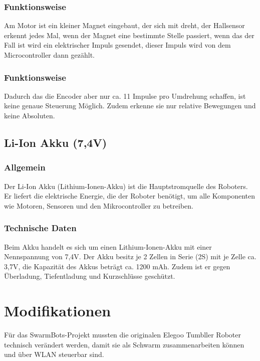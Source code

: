 \subsubsection{Funktionsweise}
Am Motor ist ein kleiner Magnet eingebaut, der sich mit dreht, der Hallsensor erkennt jedes Mal, wenn der Magnet eine bestimmte Stelle passiert, 
wenn das der Fall ist wird ein elektrischer Impuls gesendet, dieser Impuls wird von dem Microcontroller dann gezählt.
\subsubsection{Funktionsweise}
Dadurch das die Encoder aber nur ca. 11 Impulse pro Umdrehung schaffen, ist keine genaue Steuerung Möglich. 
Zudem erkenne sie nur relative Bewegungen und keine Absoluten.
%
\subsection{Li-Ion Akku (7,4V)}
%
\subsubsection{Allgemein}
Der Li-Ion Akku (Lithium-Ionen-Akku) ist die Hauptstromquelle des Roboters. 
Er liefert die elektrische Energie, die der Roboter benötigt, um alle Komponenten wie Motoren, Sensoren und den Mikrocontroller zu betreiben.
\subsubsection{Technische Daten}
Beim Akku handelt es sich um einen Lithium-Ionen-Akku mit einer Nennspannung von 7,4V. 
Der Akku besitz je 2 Zellen in Serie (2S) mit je Zelle ca. 3,7V, die Kapazität des Akkus beträgt ca. 1200 mAh. Zudem ist er gegen Überladung, Tiefentladung und Kurzschlüsse geschützt. 
%

\section{Modifikationen}
\label{subsec:hardware_modifikationen}
Für das SwarmBots-Projekt mussten die originalen Elegoo Tumbller Roboter technisch verändert werden, damit sie als Schwarm zusammenarbeiten können und über WLAN steuerbar sind.
